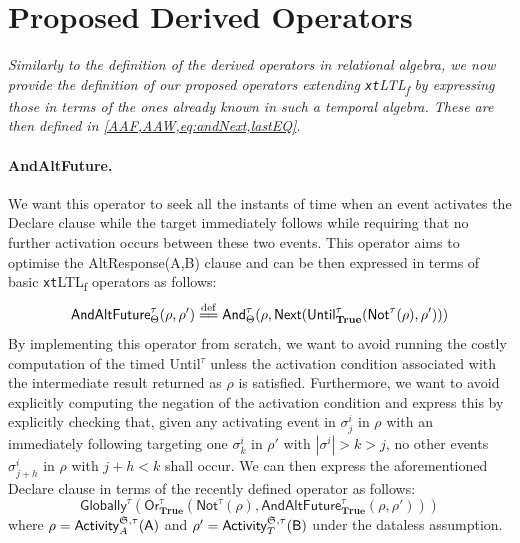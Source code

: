 \documentclass[sigconf]{acmart}
\newcommand{\eqdef}{\overset{\mathrm{def}}{=\joinrel=}}
\begin{document}



\section{Proposed Derived Operators}\label{sec:opdef}
\textit{Similarly to the definition of the derived operators in relational algebra, we now provide the definition of our proposed operators extending \texttt{xt}LTL\textsubscript{f} by expressing those in terms of the ones already known in such a temporal algebra. These are then defined in \cref{AAF,AAW,eq:andNext,lastEQ}. %
}
\medskip

\paragraph{AndAltFuture.} We want this operator to seek all the instants of time when an event activates the Declare clause while the target immediately follows while requiring that no further activation occurs between these two events. This operator aims  to optimise the \textsf{AltResponse(A,B)} clause and can be then expressed in terms of basic \texttt{xt}LTL\textsubscript{f} operators as follows:
\begin{equation}\label{AAF}
\textsf{AndAltFuture}^\tau_\Theta(\rho,\rho')\eqdef\textsf{And}^\tau_\Theta(\rho,\textsf{Next}(\textsf{Until}^\tau_\textbf{True}(\textsf{Not}^\tau(\rho),\rho')))
\end{equation}
By implementing this operator from scratch, we want to avoid running the costly computation of the timed \textsf{Until}$^\tau$ unless the activation condition associated with the intermediate result returned as $\rho$ is satisfied. Furthermore, we want to avoid explicitly computing the negation of the activation condition and express this by explicitly checking that, given any activating event in $\sigma^i_j$ in $\rho$ with an immediately following targeting one $\sigma^i_{k}$ in $\rho'$ with $|\sigma^i|>k>j$, no other events $\sigma^i_{j+h}$ in $\rho$ with $j+h<k$ shall occur. We can then express the aforementioned Declare clause in terms of the recently defined operator as follows:
\begin{equation}\label{qp1}
\textsf{Globally}^\tau(\textsf{Or}^\tau_\textbf{True}(\textsf{Not}^\tau(\rho),\textsf{AndAltFuture}^{\tau}_{\textbf{True}}(\rho,\rho')))
\end{equation}
where $\rho=\textsf{Activity}^{\mathfrak{S},\tau}_A(\textsf{A})$ and $\rho'=\textsf{Activity}^{\mathfrak{S},\tau}_T(\textsf{B})$ under the dataless assumption.
\medskip
\end{document}
